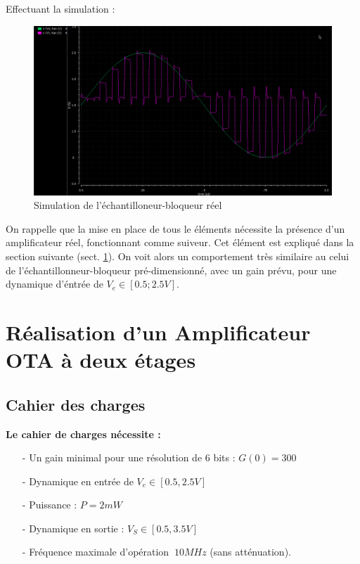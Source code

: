 \documentclass[11pt]{article}
\begin{document}
Effectuant la simulation :

\begin{figure}[!htb]
\begin{center}
  \includegraphics[width=0.80\linewidth]{simu_ech_bloqueur_reel.png}
  \caption{Simulation de l'\'echantilloneur-bloqueur r\'eel}
\end{center}
\end{figure}

On rappelle que la mise en place de tous le \'el\'ements n\'ecessite la pr\'esence d'un amplificateur
r\'eel, fonctionnant comme suiveur. Cet \'el\'ement est expliqu\'e dans la section suivante (sect. \ref{OTA_sect}). On voit alors un comportement tr\`es similaire au celui de l'\'echantillonneur-bloqueur pr\'e-dimensionn\'e, avec un gain pr\'evu, pour une dynamique d'\'entr\'ee de $V_e \in [0.5; 2.5 V] $.

\clearpage
\section{R\'ealisation d'un Amplificateur OTA \`a deux \'etages}\label{OTA_sect}

\subsection{Cahier des charges}

\textbf{Le cahier de charges n\'ecessite :}
\begin{itemize} \itemsep -4pt
  \item[-] Un gain minimal pour une r\'esolution de 6 bits : $G(0) = 300$
  \item[-] Dynamique en entr\'ee de $V_e \in [0.5, 2.5 V]$
  \item[-] Puissance : $P = 2mW$
  \item[-] Dynamique en sortie : $V_S \in [0.5, 3.5 V]$
    \item[-] Fr\'equence maximale d'op\'eration $~ 10 MHz$ (sans att\'enuation).
\end{itemize}
\end{document}
